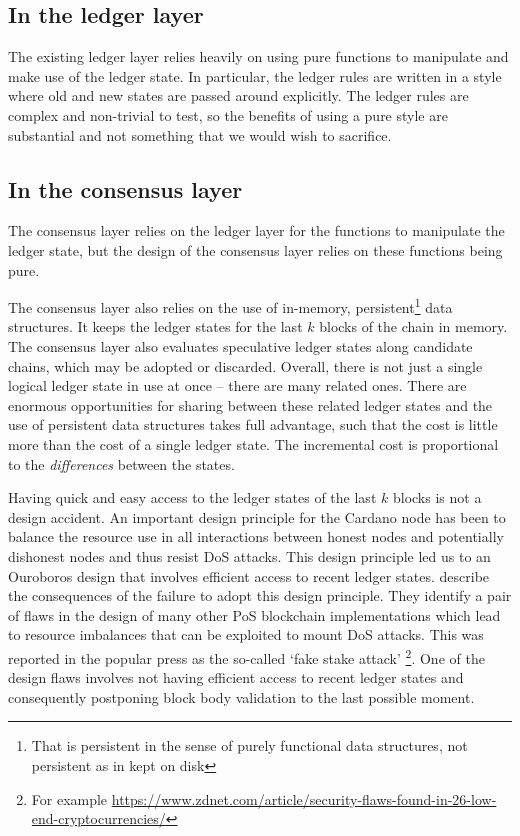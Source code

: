 \documentclass[11pt,a4paper]{article}
\begin{document}
\subsection{In the ledger layer}
\label{ledger-state-handling-in-the-current-ledger-layer}

The existing ledger layer relies heavily on using pure functions to manipulate
and make use of the ledger state. In particular, the ledger rules are written in
a style where old and new states are passed around explicitly. The ledger rules
are complex and non-trivial to test, so the benefits of using a pure style are
substantial and not something that we would wish to sacrifice.

\subsection{In the consensus layer}
\label{ledger-state-handling-in-the-current-consensus-layer}

The consensus layer relies on the ledger layer for the functions to manipulate
the ledger state, but the design of the consensus layer relies on these
functions being pure.

The consensus layer also relies on the use of in-memory,
persistent\footnote{That is persistent in the sense of purely functional data
structures, not persistent as in kept on disk} data structures. It keeps the
ledger states for the last $k$ blocks of the chain in memory. The consensus
layer also evaluates speculative ledger states along candidate chains, which may
be adopted or discarded. Overall, there is not just a single logical ledger
state in use at once -- there are many related ones. There are enormous
opportunities for sharing between these related ledger states and the use of
persistent data structures takes full advantage, such that the cost is little
more than the cost of a single ledger state. The incremental cost is
proportional to the \emph{differences} between the states.

Having quick and easy access to the ledger states of the last $k$ blocks is not
a design accident. An important design principle for the Cardano node has been
to balance the resource use in all interactions between honest nodes and
potentially dishonest nodes and thus resist DoS attacks. This design principle
led us to an Ouroboros design that involves efficient access to recent ledger
states. \citet{fake-stake} describe the consequences of the failure to adopt
this design principle. They identify a pair of flaws in the design of many
other PoS blockchain implementations which lead to resource imbalances that can
be exploited to mount DoS attacks. This was reported in the popular press as
the so-called `fake stake attack'%
\footnote{For example \url{https://www.zdnet.com/article/security-flaws-found-in-26-low-end-cryptocurrencies/}}.
One of the design flaws involves not having efficient access to recent ledger
states and consequently postponing block body validation to the last possible
moment.
\end{document}
